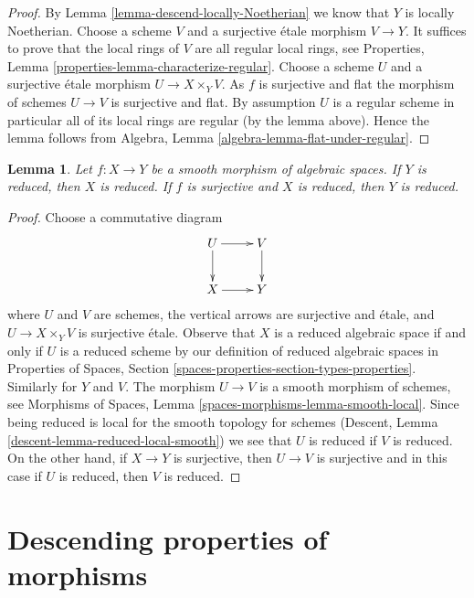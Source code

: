 \documentclass{stacks-project}
\theoremstyle{plain}
\newtheorem{lemma}[subsection]{Lemma}
\theoremstyle{definition}
\theoremstyle{remark}
\numberwithin{equation}{subsection}
\begin{document}
\begin{proof}
By
Lemma \ref{lemma-descend-locally-Noetherian}
we know that $Y$ is locally Noetherian.
Choose a scheme $V$ and a surjective \'etale morphism $V \to Y$.
It suffices to prove that the local rings of $V$ are all regular local
rings, see
Properties, Lemma \ref{properties-lemma-characterize-regular}.
Choose a scheme $U$ and a surjective \'etale morphism
$U \to X \times_Y V$. As $f$ is surjective and flat the morphism of schemes
$U \to V$ is surjective and flat. By assumption $U$ is a regular scheme
in particular all of its local rings are regular (by the lemma above).
Hence the lemma follows from
Algebra, Lemma \ref{algebra-lemma-flat-under-regular}.
\end{proof}

\begin{lemma}
\label{lemma-reduced-local-smooth}
Let $f : X \to Y$ be a smooth morphism of algebraic spaces.
If $Y$ is reduced, then $X$ is reduced. If $f$ is surjective
and $X$ is reduced, then $Y$ is reduced.
\end{lemma}

\begin{proof}
Choose a commutative diagram
$$
\xymatrix{
U \ar[d] \ar[r] & V \ar[d] \\
X \ar[r] & Y
}
$$
where $U$ and $V$ are schemes, the vertical arrows are surjective and
\'etale, and $U \to X \times_Y V$ is surjective \'etale. Observe that $X$ is
a reduced algebraic space if and only if $U$ is a reduced scheme
by our definition of reduced algebraic spaces in
Properties of Spaces, Section \ref{spaces-properties-section-types-properties}.
Similarly for $Y$ and $V$. 
The morphism $U \to V$ is a smooth morphism of schemes, see
Morphisms of Spaces, Lemma \ref{spaces-morphisms-lemma-smooth-local}.
Since being reduced is local for the smooth topology for
schemes (Descent, Lemma \ref{descent-lemma-reduced-local-smooth})
we see that $U$ is reduced if $V$ is reduced.
On the other hand, if $X \to Y$ is surjective, then $U \to V$ is
surjective and in this case if $U$ is reduced, then $V$ is reduced.
\end{proof}







\section{Descending properties of morphisms}
\label{section-descending-properties-morphisms}
\end{document}

